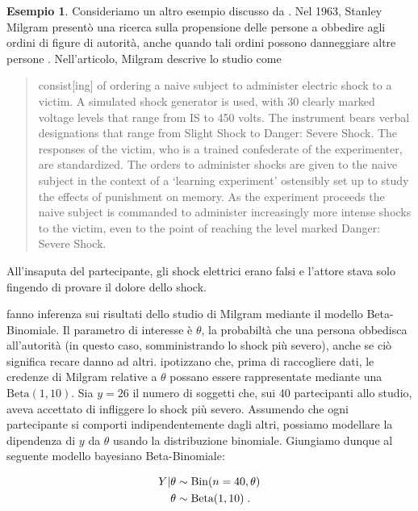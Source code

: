 \documentclass[
]{memoir}
\DeclareMathOperator{\Bin}{Bin} %
\theoremstyle{definition}
\theoremstyle{definition}
\newtheorem{example}{Esempio}[chapter]
\theoremstyle{definition}
\theoremstyle{definition}
\theoremstyle{remark}
\begin{document}
\begin{example}

Consideriamo un altro esempio discusso da \citet{Johnson2022bayesrules}. Nel 1963, Stanley Milgram presentò una ricerca sulla propensione delle persone a obbedire agli ordini di figure di autorità, anche quando tali ordini possono danneggiare altre persone \citep{milgram1963behavioral}. Nell'articolo, Milgram descrive lo studio come

\begin{quote}
consist{[}ing{]} of ordering a naive subject to administer electric shock to a victim. A simulated shock generator is used, with 30 clearly marked voltage levels that range from IS to 450 volts. The instrument bears verbal designations that range from Slight Shock to Danger: Severe Shock. The responses of the victim, who is a trained confederate of the experimenter, are standardized. The orders to administer shocks are given to the naive subject in the context of a `learning experiment' ostensibly set up to study the effects of punishment on memory. As the experiment proceeds the naive subject is commanded to administer increasingly more intense shocks to the victim, even to the point of reaching the level marked Danger: Severe Shock.
\end{quote}

All'insaputa del partecipante, gli shock elettrici erano falsi e l'attore stava solo fingendo di provare il dolore dello shock.

\citet{Johnson2022bayesrules} fanno inferenza sui risultati dello studio di Milgram mediante il modello Beta-Binomiale. Il parametro di interesse è \(\theta\), la probabiltà che una persona obbedisca all'autorità (in questo caso, somministrando lo shock più severo), anche se ciò significa recare danno ad altri. \citet{Johnson2022bayesrules} ipotizzano che, prima di raccogliere dati, le credenze di Milgram relative a \(\theta\) possano essere rappresentate mediante una \(\text{Beta}(1, 10)\). Sia \(y = 26\) il numero di soggetti che, sui 40 partecipanti allo studio, aveva accettato di infliggere lo shock più severo. Assumendo che ogni partecipante si comporti indipendentemente dagli altri, possiamo modellare la dipendenza di \(y\) da \(\theta\) usando la distribuzione binomiale. Giungiamo dunque al seguente modello bayesiano Beta-Binomiale:

\begin{align}
Y | \theta & \sim \Bin(n = 40, \theta) \notag\\
\theta & \sim \text{Beta}(1, 10) \; . \notag
\end{align}


\end{example}
\end{document}
